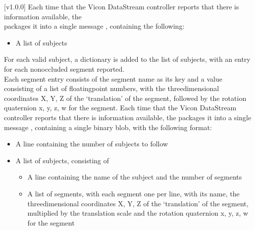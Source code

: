 [v1.0.0]
Each time that the Vicon DataStream controller reports that there is information
available, the\\
 packages it into a single message
\openSq{}\closeSq, containing the following:
\begin{itemize}
\item A list of subjects
\end{itemize}

For each valid subject, a dictionary \openSq{}\closeSq{} is added to the
list of subjects, with an entry for each non\longDash{}occluded segment reported.\\

Each segment entry consists of the segment name as its key and a value consisting of a
list of floating\longDash{}point numbers, with the three\longDash{}dimensional coordinates
\openSq{}X, Y, Z\closeSq{} of the `translation' of the segment, followed by the rotation
quaternion \openSq{}x, y, z, w\closeSq{} for the segment.
\primaryEnd{}
Each time that the Vicon DataStream controller reports that there is information
available, the  packages it into a single message
\openSq{}\closeSq, containing a single binary blob, with the following
format:
\begin{itemize}
\item A line containing the number of subjects to follow
\item\exSp{}A list of subjects, consisting of
\begin{itemize}
\item A line containing the name of the subject and the number of segments
\item\exSp{}A list of segments, with each segment one per line, with its name, the
three\longDash{}dimensional coordinates \openSq{}X, Y, Z\closeSq{} of the `translation'
of the segment, multiplied by the translation scale and the rotation quaternion
\openSq{}x, y, z, w\closeSq{} for the segment
\end{itemize}
\end{itemize}
\primaryEnd{}
